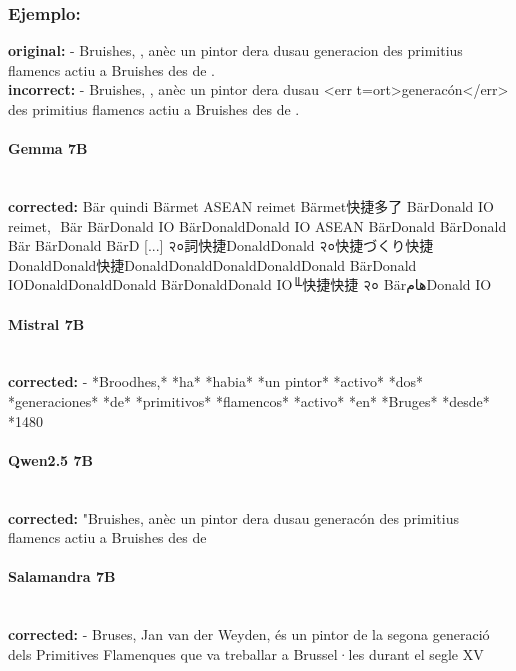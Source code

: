 \subsubsection{Ejemplo:}
\textbf{original:} - Bruishes, , anèc un pintor dera dusau generacion des primitius flamencs actiu a Bruishes des de .\\
\textbf{incorrect:} - Bruishes, , anèc un pintor dera dusau {\textless}err t=ort{\textgreater}generacón{\textless}/err{\textgreater} des primitius flamencs actiu a Bruishes des de .

\paragraph{Gemma 7B}~\\
\textbf{corrected:} Bär quindi Bärmet ASEAN reimet Bärmet快捷多了 BärDonald IO reimet,\,\ Bär BärDonald IO BärDonaldDonald IO ASEAN BärDonald BärDonald Bär BärDonald BärD [...]  २०詞快捷DonaldDonald २०快捷づくり快捷DonaldDonald快捷DonaldDonaldDonaldDonaldDonald BärDonald IODonaldDonaldDonald BärDonaldDonald IO╙快捷快捷 २० BärهامDonald IO

\paragraph{Mistral 7B}~\\
\textbf{corrected:} - *Broodhes,* *ha* *habia* *un pintor* *activo* *dos* *generaciones* *de* *primitivos* *flamencos* *activo* *en* *Bruges* *desde* *1480

\paragraph{Qwen2.5 7B}~\\
\textbf{corrected:} "Bruishes, anèc un pintor dera dusau generacón des primitius flamencs actiu a Bruishes des de

\paragraph{Salamandra 7B}~\\
\textbf{corrected:} - Bruses, Jan van der Weyden, és un pintor de la segona generació dels Primitives Flamenques que va treballar a Brussel·les durant el segle XV